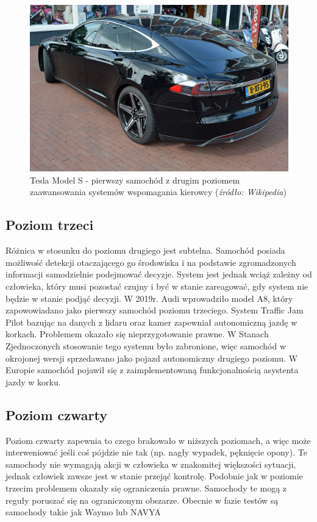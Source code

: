 \begin{figure}
  \centering
  \includegraphics[width=12cm]{img/tesla.jpg}
  \caption{Tesla Model S - pierwszy samochód z drugim poziomem zaawansowania systemów wspomagania kierowcy (\textit{źródło: Wikipedia})}
  \label{fig:teslas}
\end{figure}

\subsection{Poziom trzeci}
Różnica w stosunku do poziomu drugiego jest subtelna. Samochód posiada możliwość detekcji otaczającego go środowiska i na podstawie zgromadzonych informacji samodzielnie podejmować decyzje. System jest jednak wciąż zależny od człowieka, który musi pozostać czujny i być w stanie zareagować, gdy system nie będzie w stanie podjąć decyzji. W 2019r. Audi wprowadziło model A8, który zapowowiadano jako pierwszy samochód poziomu trzeciego. System Traffic Jam Pilot bazując na danych z lidaru oraz kamer zapewniał autonomiczną jazdę w korkach. Problemem okazało się nieprzygotowanie prawne. W Stanach Zjednoczonych stosowanie tego systemu było zabronione, więc samochód w okrojonej wersji sprzedawano jako pojazd autonomiczny drugiego poziomu. W Europie samochód pojawił się z zaimplementowaną funkcjonalnością asystenta jazdy w korku.

\subsection{Poziom czwarty}
Poziom czwarty zapewnia to czego brakowało w niższych poziomach, a więc może interweniować jeśli coś pójdzie nie tak (np. nagły wypadek, pęknięcie opony). Te samochody nie wymagają akcji w człowieka w znakomitej większości sytuacji, jednak człowiek zawsze jest w stanie przejąć kontrolę. Podobnie jak w poziomie trzecim problemem okazały się ograniczenia prawne. Samochody te mogą z reguły poruszać się na ograniczonym obszarze. Obecnie w fazie testów są samochody takie jak Waymo lub NAVYA

